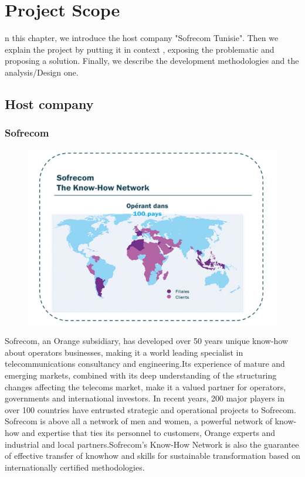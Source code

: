 %
%
\let\textcircled=\pgftextcircled
\chapter{Project Scope}
\label{chap:intro}

n this chapter, we introduce the host company "Sofrecom Tunisie". 
 Then we explain the project by putting it in context , exposing the problematic and proposing a solution. 
 Finally, we describe the development methodologies and the analysis/Design one.

\section{Host company}
\label{sec:sec01}
\subsection{Sofrecom}
\label{sec:sec01}

\begin{figure}[h!]
	\centering
	\includegraphics[height=0.3\textheight]{fig01/FilialesEtClients}
	\label{fig:FilialesEtClients}
\end{figure}
Sofrecom, an Orange subsidiary, has developed over 50 years unique know-how about operators businesses, 
making it a world leading specialist in telecommunications consultancy and engineering.Its experience of
 mature and emerging markets, combined with its deep understanding of the structuring changes affecting 
 the telecoms market, make it a valued partner for operators, governments and international investors.
  In recent years, 200 major players in over 100 countries have entrusted strategic and operational projects to Sofrecom.
  Sofrecom is above all a network of men and women, a powerful network of know-how and expertise that ties its 
  personnel to customers, Orange experts and industrial and local partners.Sofrecom's Know-How Network 
  is also the guarantee of effective transfer of knowhow and skills for sustainable transformation based 
  on internationally certified methodologies.


